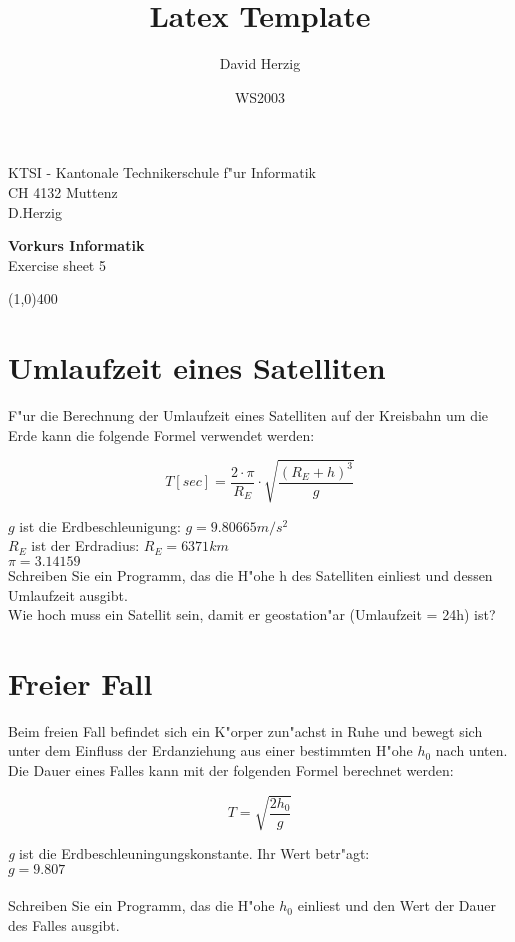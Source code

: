 \documentclass[a4paper,10pt]{article}
\title{Latex Template}
\author{David Herzig}
\date{WS2003}
\begin{document}
KTSI - Kantonale Technikerschule f"ur Informatik\\
CH 4132 Muttenz\\
D.Herzig

\vspace{2mm}

\begin{center}
{\Large \bf Vorkurs Informatik}\\
Exercise sheet 5
\end{center}

\vspace{2mm}

\line(1,0){400}

\vspace{5mm}

\section{Umlaufzeit eines Satelliten}
F"ur die Berechnung der Umlaufzeit eines Satelliten auf der Kreisbahn um die
Erde kann die folgende Formel verwendet werden:

\begin{displaymath}
T[sec] = \frac{2 \cdot \pi}{R_{E}} \cdot \sqrt{\frac{(R_{E}+h)^{3}}{g}}
\end{displaymath}

$g$ ist die Erdbeschleunigung: $g = 9.80665 m/s^{2}$\\
$R_{E}$ ist der Erdradius: $R_{E} = 6371 km$\\
$\pi = 3.14159$\\

Schreiben Sie ein Programm, das die H"ohe h des Satelliten einliest und dessen
Umlaufzeit ausgibt.\\
Wie hoch muss ein Satellit sein, damit er geostation"ar (Umlaufzeit = 24h) ist?


\section{Freier Fall}
Beim freien Fall befindet sich ein K"orper zun"achst in Ruhe und bewegt sich
unter dem Einfluss der Erdanziehung aus einer bestimmten H"ohe $h_0$ nach unten. Die
Dauer eines Falles kann mit der folgenden Formel berechnet werden:

\begin{displaymath}
T = \sqrt{\frac{2h_0}{g}}
\end{displaymath}

\emph{g} ist die Erdbeschleuningungskonstante. Ihr Wert betr"agt:\\
$g=9.807$\\
\\
Schreiben Sie ein Programm, das die H"ohe $h_0$ einliest und den Wert der
Dauer des Falles ausgibt.
\end{document}
